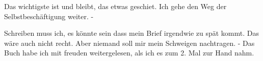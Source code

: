 Das wichtigste ist und bleibt, das etwas geschiet.
Ich gehe den Weg der Selbstbesch\"{a}ftigung weiter. -

Schreiben muss ich, es k\"{o}nnte sein dass mein Brief irgendwie zu sp\"{a}t kommt.
Das w\"{a}re auch nicht recht.
Aber niemand soll mir mein Schweigen nachtragen.
- Das Buch habe ich mit freuden weitergelesen, als ich es zum 2. Mal zur Hand nahm.

\clearpage
